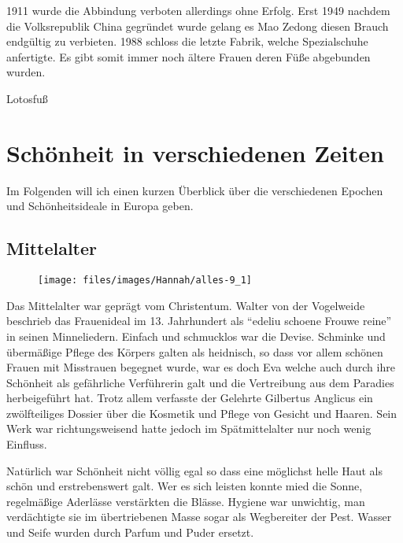1911 wurde die Abbindung verboten allerdings ohne Erfolg. Erst 1949 nachdem
die Volksrepublik China gegründet wurde gelang es Mao Zedong diesen Brauch endgültig zu verbieten.
1988 schloss die letzte Fabrik, welche Spezialschuhe anfertigte. Es gibt somit immer noch ältere
Frauen deren Füße abgebunden wurden.

\begin{figurewrapper}
	 \hfill
	\caption{Lotosfuß}
\end{figurewrapper}


\section{Schönheit in verschiedenen Zeiten}

Im Folgenden will ich einen kurzen Überblick über die verschiedenen Epochen und Schönheitsideale
in Europa geben.

\subsection{Mittelalter}

\begin{wrapfigure}{r}{0pt}
	\texttt{[image: files/images/Hannah/alles-9\_1]}%
\end{wrapfigure}
Das Mittelalter war geprägt vom Christentum. Walter von der Vogelweide beschrieb das Frauenideal im
13. Jahrhundert als \enquote{edeliu schoene Frouwe reine} in seinen Minneliedern. Einfach und
schmucklos war die Devise. Schminke und übermäßige Pflege des Körpers galten als heidnisch, so dass
vor allem schönen Frauen mit Misstrauen begegnet wurde, war es doch Eva welche auch durch
ihre Schönheit als gefährliche Verführerin galt und die Vertreibung
aus dem Paradies herbeigeführt hat. Trotz allem verfasste der Gelehrte Gilbertus
Anglicus ein zwölfteiliges Dossier über die Kosmetik und Pflege von Gesicht und Haaren. Sein Werk war
richtungsweisend hatte jedoch im Spätmittelalter nur noch wenig Einfluss.

Natürlich war Schönheit nicht völlig egal so dass eine möglichst helle Haut als schön und
erstrebenswert galt. Wer es sich leisten konnte mied die Sonne, regelmäßige Aderlässe verstärkten die
Blässe. Hygiene war unwichtig, man verdächtigte sie im übertriebenen Masse sogar als Wegbereiter der
Pest. Wasser und Seife wurden durch Parfum und Puder ersetzt.

